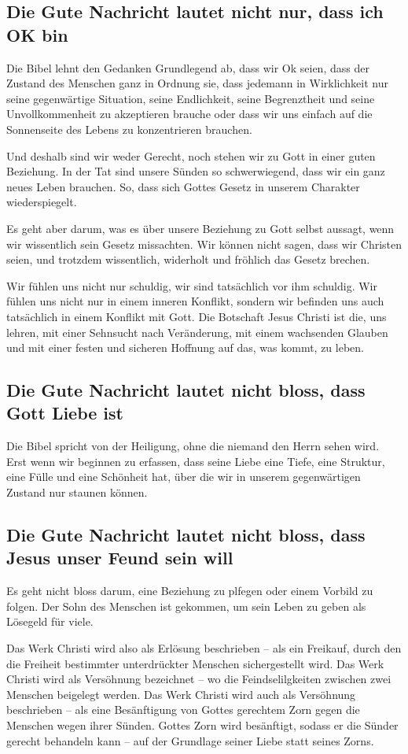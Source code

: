 \documentclass{../../inc/mybib}
\begin{document}
\subsection{Die Gute Nachricht lautet nicht nur, dass ich OK bin}
Die Bibel lehnt den Gedanken Grundlegend ab, dass wir Ok seien, dass der Zustand des Menschen ganz in Ordnung sie, dass jedemann in Wirklichkeit nur seine gegenwärtige Situation, seine Endlichkeit, seine Begrenztheit und seine Unvollkommenheit zu akzeptieren brauche oder dass wir uns einfach auf die Sonnenseite des Lebens zu konzentrieren brauchen.

Und deshalb sind wir weder Gerecht, noch stehen wir zu Gott in einer guten Beziehung. In der Tat sind unsere Sünden so schwerwiegend, dass wir ein ganz neues Leben brauchen.
So, dass sich Gottes Gesetz in unserem Charakter wiederspiegelt.

Es geht aber darum, was es über unsere Beziehung zu Gott selbst aussagt, wenn wir wissentlich sein Gesetz missachten. Wir können nicht sagen, dass wir Christen seien, und trotzdem wissentlich, widerholt und fröhlich das Gesetz brechen.

Wir fühlen uns nicht nur schuldig, wir sind tatsächlich vor ihm schuldig. Wir fühlen uns nicht nur in einem inneren Konflikt, sondern wir befinden uns auch tatsächlich in einem Konflikt mit Gott. Die Botschaft Jesus Christi ist die, uns lehren, mit einer Sehnsucht nach Veränderung, mit einem wachsenden Glauben und mit einer festen und sicheren Hoffnung auf das, was kommt, zu leben.
\subsection{Die Gute Nachricht lautet nicht bloss, dass Gott Liebe ist}
Die Bibel spricht von der Heiligung, ohne die niemand den Herrn sehen wird. Erst wenn wir beginnen zu erfassen, dass seine Liebe eine Tiefe, eine Struktur, eine Fülle und eine Schönheit hat, über die wir in unserem gegenwärtigen Zustand nur staunen können.
\subsection{Die Gute Nachricht lautet nicht bloss, dass Jesus unser Feund sein will}
Es geht nicht bloss darum, eine Beziehung zu plfegen oder einem Vorbild zu folgen. Der Sohn des Menschen ist gekommen, um sein Leben zu geben als Lösegeld für viele.

Das Werk Christi wird also als Erlösung beschrieben -- als ein Freikauf, durch den die Freiheit bestimmter unterdrückter Menschen sichergestellt wird. Das Werk Christi wird als Versöhnung bezeichnet -- wo die Feindselilgkeiten zwischen zwei Menschen beigelegt werden. Das Werk Christi wird auch als Versöhnung beschrieben -- als eine Besänftigung von Gottes gerechtem Zorn gegen die Menschen wegen ihrer Sünden. Gottes Zorn wird besänftigt, sodass er die Sünder gerecht behandeln kann -- auf der Grundlage seiner Liebe statt seines Zorns.
\end{document}
